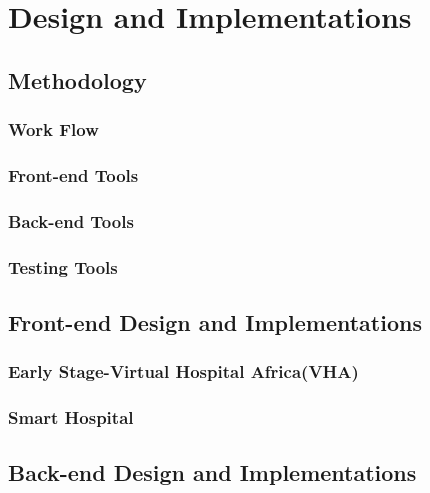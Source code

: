 %
%
\chapter{Design and Implementations}
\label{chap:D&I}

\section{Methodology}
\label{sec:sec01}

\subsection{Work Flow}
\label{subsec:subsec01}

\subsection{Front-end Tools}
\label{subsec:FETools}


\subsection{Back-end Tools}
\label{subsec:BETools}




\subsection{Testing Tools}
\label{subsec:subsec05}

\section{Front-end Design and Implementations}
\label{sec:sec02}

\subsection{Early Stage-Virtual Hospital Africa(VHA)}
\label{subsec:subsec01}



\subsection{Smart Hospital}
\label{subsec:subsec02}


\section{Back-end Design and Implementations}
\label{sec:sec03}


